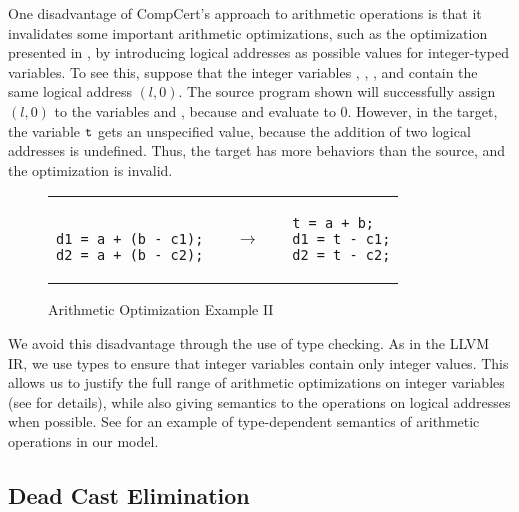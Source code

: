 One disadvantage of CompCert's approach to arithmetic operations is that it invalidates some important arithmetic optimizations, such as the optimization presented in , by introducing logical addresses as possible values for integer-typed variables. 
To see this, suppose that the integer variables , , , and  contain the same logical address $(l,0)$. The source program shown will successfully assign $(l,0)$ to the variables  and , because  and  evaluate to $0$. However, in the target, the variable $\texttt{t}$ gets an unspecified value, because the addition of two logical addresses is undefined. Thus, the target has more behaviors than the source, and the optimization is invalid.

\begin{figure}[t]
\center
\begin{tabular}{lll}
\begin{minipage}{0.3\textwidth}
\begin{verbatim}

d1 = a + (b - c1);
d2 = a + (b - c2);
\end{verbatim}
\end{minipage}
&
$\quad\rightarrow\quad$
&
\begin{minipage}{0.3\textwidth}
\begin{verbatim}
t = a + b;
d1 = t - c1;
d2 = t - c2;
\end{verbatim}
\end{minipage}
\end{tabular}
\caption{Arithmetic Optimization Example II}\label{fig:intptrcast:formal-semantics:arith2}
\end{figure}

We avoid this disadvantage through the use of type checking. 
As in the LLVM IR, we use types to ensure that integer variables contain only integer values.
This allows us to justify the full range of arithmetic optimizations on integer variables (see  for details), 
while also giving semantics to the operations on logical addresses when possible.
See  for an example of type-dependent semantics of arithmetic operations in our model.

\subsection{Dead Cast Elimination}
\label{sec:intptrcast:formal-semantics:deadcast}

